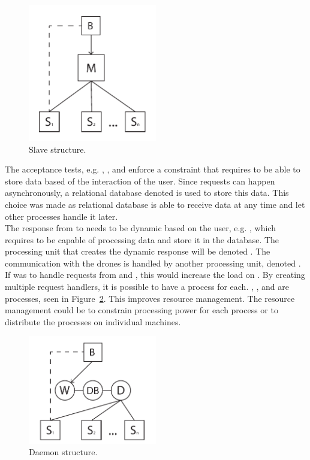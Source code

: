 \begin{figure}[htb]
    \centering
    \includegraphics[width=0.5\textwidth]{gfx/slave_structure.pdf}
    \caption{Slave structure.}
    \label{fig:slave_structure}
\end{figure}

The acceptance tests, e.g. , , and  enforce a constraint that requires  to be able to store data based of the interaction of the user.
Since requests can happen asynchronously, a relational database denoted  is used to store this data. 
This choice was made as relational database is able to receive data at any time and let other processes handle it later.\\

The response from  to  needs to be dynamic based on the user, e.g. , which requires  to be capable of processing data and store it in the database.
The processing unit that creates the dynamic response will be denoted .
The communication with the drones is handled by another processing unit, denoted .
If  was to handle requests from  and , this would increase the load on .
By creating multiple request handlers, it is possible to have a process for each. , , and  are processes, seen in Figure~\ref{fig:daemon_structure}. 
This improves resource management.
The resource management could be to constrain processing power for each process or to distribute the processes on individual machines. \\

\begin{figure}[htb]
    \centering
    \includegraphics[width=0.5\textwidth]{gfx/daemon_structure.pdf}
    \caption{Daemon structure.}
    \label{fig:daemon_structure}
\end{figure}

